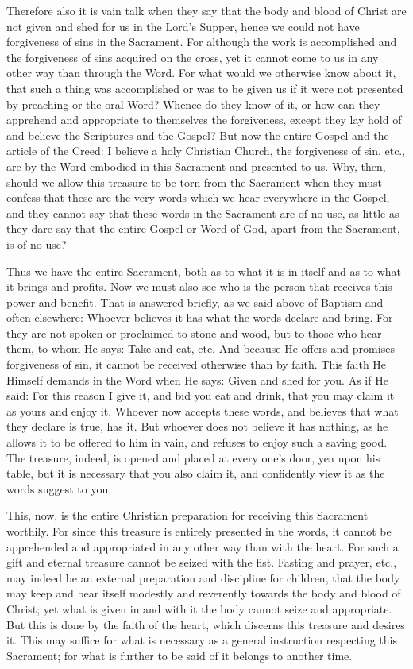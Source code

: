 Therefore also it is vain talk when they say that the body and blood of
Christ are not given and shed for us in the Lord's Supper, hence we
could not have forgiveness of sins in the Sacrament. For although the
work is accomplished and the forgiveness of sins acquired on the cross,
yet it cannot come to us in any other way than through the Word. For
what would we otherwise know about it, that such a thing was
accomplished or was to be given us if it were not presented by
preaching or the oral Word? Whence do they know of it, or how can they
apprehend and appropriate to themselves the forgiveness, except they
lay hold of and believe the Scriptures and the Gospel? But now the
entire Gospel and the article of the Creed: I believe a holy Christian
Church, the forgiveness of sin, etc., are by the Word embodied in this
Sacrament and presented to us. Why, then, should we allow this treasure
to be torn from the Sacrament when they must confess that these are the
very words which we hear everywhere in the Gospel, and they cannot say
that these words in the Sacrament are of no use, as little as they dare
say that the entire Gospel or Word of God, apart from the Sacrament, is
of no use?

Thus we have the entire Sacrament, both as to what it is in itself and
as to what it brings and profits. Now we must also see who is the
person that receives this power and benefit. That is answered briefly,
as we said above of Baptism and often elsewhere: Whoever believes it
has what the words declare and bring. For they are not spoken or
proclaimed to stone and wood, but to those who hear them, to whom He
says: Take and eat, etc. And because He offers and promises forgiveness
of sin, it cannot be received otherwise than by faith. This faith He
Himself demands in the Word when He says: Given and shed for you. As if
He said: For this reason I give it, and bid you eat and drink, that you
may claim it as yours and enjoy it. Whoever now accepts these words,
and believes that what they declare is true, has it. But whoever does
not believe it has nothing, as he allows it to be offered to him in
vain, and refuses to enjoy such a saving good. The treasure, indeed, is
opened and placed at every one's door, yea upon his table, but it is
necessary that you also claim it, and confidently view it as the words
suggest to you.

This, now, is the entire Christian preparation for receiving this
Sacrament worthily. For since this treasure is entirely presented in
the words, it cannot be apprehended and appropriated in any other way
than with the heart. For such a gift and eternal treasure cannot be
seized with the fist. Fasting and prayer, etc., may indeed be an
external preparation and discipline for children, that the body may
keep and bear itself modestly and reverently towards the body and blood
of Christ; yet what is given in and with it the body cannot seize and
appropriate. But this is done by the faith of the heart, which discerns
this treasure and desires it. This may suffice for what is necessary
as a general instruction respecting this Sacrament; for what is
further to be said of it belongs to another time.

